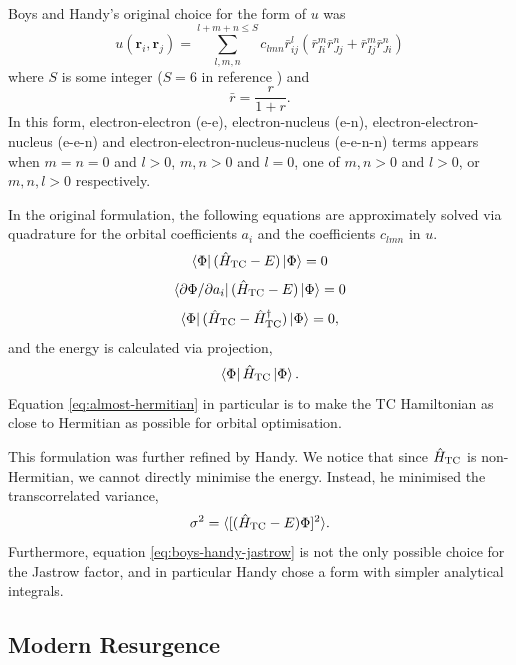 Boys and Handy's original choice for the form of $u$ was
\begin{equation}
    \label{eq:boys-handy-jastrow}
    u(\bm r_i, \bm r_j) = \sum_{l,m,n}^{l+m+n\leq S} c_{lmn}\bar r_{ij}^l(\bar r_{Ii}^m\bar r_{Jj}^n + \bar r_{Ij}^m\bar r_{Ji}^n)
\end{equation}
where $S$ is some integer ($S=6$ in reference ) and
\begin{equation}
    \bar r = \frac{r}{1+r}.
\end{equation}
In this form, electron-electron (e-e), electron-nucleus (e-n), electron-electron-nucleus (e-e-n) and electron-electron-nucleus-nucleus (e-e-n-n) terms appears when $m=n=0$ and $l>0$, $m,n>0$ and $l=0$, one of $m,n>0$ and $l>0$, or $m,n,l>0$ respectively.

In the original formulation, the following equations are approximately solved via quadrature for the orbital coefficients $a_i$ and the coefficients $c_{lmn}$ in $u$.
\begin{equation}
    \bra\Phi(\hat H_\mathrm{TC} - E)\ket\Phi = 0
\end{equation}
\begin{equation}
    \bra{\partial\Phi/\partial a_i}(\hat H_\mathrm{TC} - E)\ket\Phi = 0
\end{equation}
\begin{equation}
    \label{eq:almost-hermitian}
    \bra\Phi(\hat H_\mathrm{TC} - \hat H_\mathrm{TC}^\dag)\ket\Phi = 0,
\end{equation}
and the energy is calculated via projection,
\begin{equation}
    \bra\Phi\hat H_\mathrm{TC}\ket\Phi.
\end{equation}
Equation \ref{eq:almost-hermitian} in particular is to make the TC Hamiltonian as close to Hermitian as possible for orbital optimisation.

This formulation was further refined by Handy. We notice that since $\hat H_\mathrm{TC}$ is non-Hermitian, we cannot directly minimise the energy. Instead, he minimised the transcorrelated variance,
\begin{equation}
    \sigma^2 = \langle [(\hat H_\mathrm{TC} - E)\Phi]^2\rangle.
\end{equation}
Furthermore, equation \ref{eq:boys-handy-jastrow} is not the only possible choice for the Jastrow factor, and in particular Handy chose a form with simpler analytical integrals.


\subsection{Modern Resurgence}

